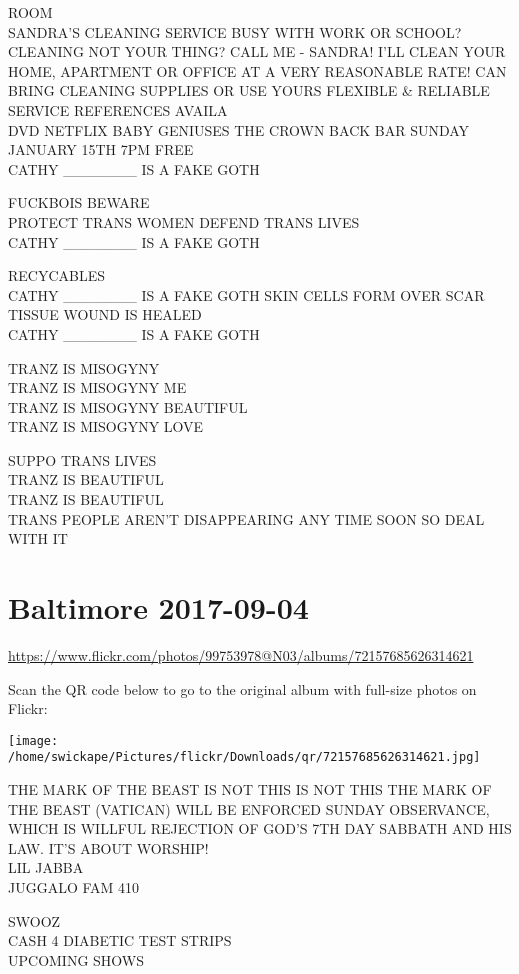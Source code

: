 \documentclass[10pt,letterpaper]{article}
\begin{document}
ROOM\\
SANDRA'S CLEANING SERVICE BUSY WITH WORK OR SCHOOL?  CLEANING NOT YOUR THING?  CALL ME {-} SANDRA!   I'LL CLEAN YOUR HOME, APARTMENT OR OFFICE AT A VERY REASONABLE RATE!  CAN BRING CLEANING SUPPLIES OR USE YOURS FLEXIBLE \& RELIABLE SERVICE REFERENCES AVAILA\\
DVD NETFLIX BABY GENIUSES THE CROWN BACK BAR SUNDAY JANUARY 15TH 7PM FREE\\
CATHY \_\_\_\_\_\_\_ IS A FAKE GOTH

FUCKBOIS BEWARE\\
PROTECT TRANS WOMEN DEFEND TRANS LIVES\\
CATHY \_\_\_\_\_\_\_ IS A FAKE GOTH

RECYCABLES\\
CATHY \_\_\_\_\_\_\_ IS A FAKE GOTH SKIN CELLS FORM OVER SCAR TISSUE WOUND IS HEALED\\
CATHY \_\_\_\_\_\_\_ IS A FAKE GOTH

TRANZ IS MISOGYNY\\
TRANZ IS MISOGYNY ME\\
TRANZ IS MISOGYNY BEAUTIFUL\\
TRANZ IS MISOGYNY LOVE

SUPPO TRANS LIVES\\
TRANZ IS BEAUTIFUL\\
TRANZ IS BEAUTIFUL\\
TRANS PEOPLE AREN'T DISAPPEARING ANY TIME SOON SO DEAL WITH IT


\section*{Baltimore 2017-09-04}

\url{https://www.flickr.com/photos/99753978@N03/albums/72157685626314621}

Scan the QR code below to go to the original album with full-size photos on Flickr:

\texttt{[image: /home/swickape/Pictures/flickr/Downloads/qr/72157685626314621.jpg]}


THE MARK OF THE BEAST IS NOT THIS IS NOT THIS THE MARK OF THE BEAST (VATICAN) WILL BE ENFORCED SUNDAY OBSERVANCE, WHICH IS WILLFUL REJECTION OF GOD'S 7TH DAY SABBATH AND HIS LAW.  IT'S ABOUT WORSHIP!\\
LIL JABBA\\
JUGGALO FAM 410

SWOOZ\\
CASH 4 DIABETIC TEST STRIPS\\
UPCOMING SHOWS
\end{document}
